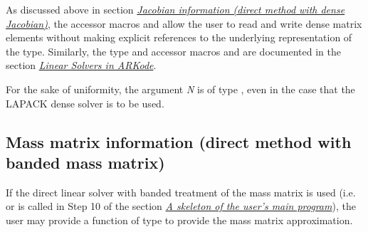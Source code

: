 \documentclass[letterpaper,10pt,english]{sphinxmanual}
\begin{document}
\begin{fulllineitems}
As discussed above in section {\hyperref[c_interface/User_supplied:cinterface-densejacobianfn]{\emph{Jacobian information (direct method with dense Jacobian)}}},
the accessor macros  and  allow the user
to read and write dense matrix elements without making explicit
references to the underlying representation of the 
type. Similarly, the  type and accessor macros
 and  are documented in the section
{\hyperref[linear_solvers/index:linearsolvers]{\emph{Linear Solvers in ARKode}}}.

For the sake of uniformity, the argument \emph{N} is of type ,
even in the case that the LAPACK dense solver is to be used.

\end{fulllineitems}



\subsection{Mass matrix information (direct method with banded mass matrix)}
\label{c_interface/User_supplied:cinterface-bandmassfn}\label{c_interface/User_supplied:mass-matrix-information-direct-method-with-banded-mass-matrix}
If the direct linear solver with banded treatment of the mass matrix is
used (i.e. {\hyperref[c_interface/User_callable:ARKMassBand]{}} or {\hyperref[c_interface/User_callable:ARKMassLapackBand]{}} is
called in Step 10 of the section {\hyperref[c_interface/Skeleton:cinterface-skeleton]{\emph{A skeleton of the user's main program}}}), the user
may provide a function of type {\hyperref[c_interface/User_supplied:ARKDlsBandMassFn]{}} to provide
the mass matrix approximation.
\end{document}
